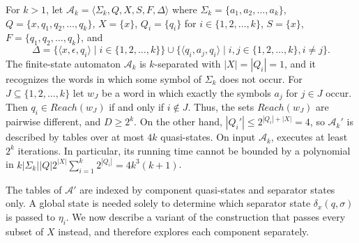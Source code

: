   For $k > 1$, let $\mathcal{A}_k = \langle \Sigma_k, Q, X, S, F, \Delta \rangle$ where
  $\Sigma_k = \{ a_1, a_2, \ldots, a_k \}$, $Q = \{ x, q_1, q_2, \ldots, q_k \}$, $X =
  \{ x \}$, $Q_i = \{ q_i \}$ for $i \in \{ 1, 2, \ldots, k \}$, $S = \{ x \}$, $F = \{
  q_1, q_2, \ldots, q_k \}$, and
  \begin{equation*}
    \Delta = \{ \langle x, \epsilon, q_i \rangle \mid i \in \{ 1, 2, \ldots, k \} \}
    \cup \{ \langle q_i, a_j, q_i \rangle \mid i, j \in \{ 1, 2, \ldots, k \}, i \neq
    j \}.
  \end{equation*}
  The finite-state automaton $\mathcal{A}_k$ is $k$-separated with $|X| = |Q_i| = 1$,
  and it recognizes the words in which some symbol of $\Sigma_k$ does not occur. For $J
  \subseteq \{ 1, 2, \ldots, k \}$ let $w_J$ be a word in which exactly the symbols
  $a_j$ for $j \in J$ occur. Then $q_i \in Reach(w_J)$ if and only if $i \not\in J$.
  Thus, the sets $Reach(w_J)$ are pairwise different, and $D \geq 2^k$. On the other
  hand, $|Q_i'| \leq 2^{|Q_i| + |X|} = 4$, so $\mathcal{A}_k'$ is described by tables
  over at most $4k$ quasi-states. On input $\mathcal{A}_k$,
   executes at least $2^k$ iterations. In particular, its
  running time cannot be bounded by a polynomial in $k |\Sigma_k| |Q| 2^{|X|}
  \sum_{i=1}^k 2^{|Q_i|} = 4k^3(k+1)$.

The tables of $\mathcal{A}'$ are indexed by component quasi-states and separator states
only. A global state is needed solely to determine which separator state $\delta_x(q,
\sigma)$ is passed to $\eta_i$. We now describe a variant of the construction that
passes every subset of $X$ instead, and therefore explores each component separately.

